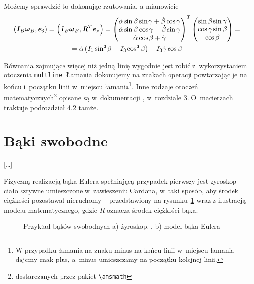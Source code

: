 \noindent
[\ldots]

\noindent
Możemy sprawdzić to dokonując rzutowania, a mianowicie
{\small
  \begin{multline}
    \left(\boldsymbol{I}_B\boldsymbol{\omega}_B, \boldsymbol{e}_3\right) = \left(\boldsymbol{I}_B\boldsymbol{\omega}_B, \boldsymbol{R}^T\boldsymbol{e}_z\right) =
    \begin{pmatrix}
    \dot\alpha\sin\beta\sin\gamma + \dot\beta\cos\gamma\\ 
    \dot\alpha\sin\beta\cos\gamma - \dot\beta\sin\gamma \\  
    \dot\alpha\cos\beta + \dot\gamma
    \end{pmatrix}^T 
    \begin{pmatrix}
    \sin\beta\sin\gamma \\ \cos\gamma\sin\beta \\ \cos\beta 
    \end{pmatrix} = \\ = \dot\alpha\left(I_1\sin^2\beta + I_3\cos^2\beta\right) + I_3\dot\gamma\cos\beta
\end{multline}}%

{\red
  Równania zajmujące więcej niż jedną linię wygodnie jest robić z~wykorzystaniem otoczenia \texttt{multline}. Łamania dokonujemy na znakach operacji powtarzając je na końcu i~początku linii w~miejscu łamania\footnote{\red W przypadku łamania na znaku minus na końcu linii w~miejscu łamania dajemy znak plus, a~minus umieszczamy na początku kolejnej linii.}. Inne rodzaje otoczeń matematycznych\footnote{\red dostarczanych przez pakiet \texttt{\textbackslash amsmath}} opisane są w~dokumentacji \cite{amsmath}, w~rozdziale 3. O~macierzach traktuje podrozdział 4.2 tamże.}

\section{Bąki swobodne}

[\ldots]

Fizyczną realizacją bąka Eulera spełniającą przypadek pierwszy jest żyroskop -- ciało sztywne umieszczone w~zawieszeniu Cardana, w~taki sposób, aby środek ciężkości pozostawał nieruchomy -- przedstawiony na rysunku~\ref{fig:Ch1_giro_model} wraz z ilustracją modelu matematycznego, gdzie $R$ oznacza środek ciężkości bąka.  
\begin{figure}[tp]
  \centering
  \def\svgscale{1}
  \hspace{25pt}\qquad
  \subfloat[]{}
  \caption{Przykład bąków swobodnych a) żyroskop, \cite{CArn}, b) model bąka Eulera}
  \label{fig:Ch1_giro_model}
    \end{figure}


